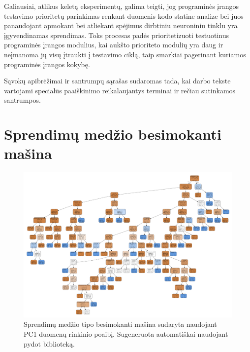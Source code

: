 \documentclass{VUMIFPSbakalaurinis}
\begin{document}
Galiausiai, atlikus keletą eksperimentų, galima teigti, jog programinės įrangos testavimo prioritetų parinkimas renkant duomenis kodo statine analize bei juos panaudojant apmokant bei atliekant spėjimus dirbtiniu neuroniniu tinklu yra įgyvendinamas sprendimas. Toks procesas padės prioritetizuoti testuotinus programinės įrangos modulius, kai aukšto prioriteto modulių yra daug ir neįmanoma jų visų įtraukti į testavimo ciklą, taip smarkiai pagerinant kuriamos programinės įrangos kokybę.

\printbibliography[heading=bibintoc]  %

Sąvokų apibrėžimai ir santrumpų sąrašas sudaromas tada, kai darbo tekste
vartojami specialūs paaiškinimo reikalaujantys terminai ir rečiau sutinkamos
santrumpos.

\appendix  %

\section{Sprendimų medžio besimokanti mašina}
\begin{figure}[H]
    \centering
    \includegraphics[scale=0.24, angle=90]{img/tree}
    \caption{Sprendimų medžio tipo besimokanti mašina sudaryta naudojant PC1 duomenų rinkinio poaibį. Sugeneruota automatiškai naudojant pydot biblioteką.}
    \label{img:tree}
\end{figure}
\end{document}
